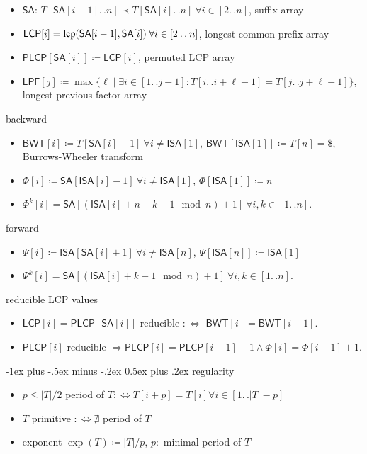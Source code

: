 \documentclass[10pt,landscape]{article}
\makeatletter
\renewcommand{\section}{\@startsection{section}{1}{0mm}%
                                {-1ex plus -.5ex minus -.2ex}%
                                {0.5ex plus .2ex}%
                                {\normalfont\large\itshape}}
\newcommand*{\EndZeichen}{\texttt{\$}}
\newcommand*{\IC}{\mathbin{{.}\,{.}}} %
\newcommand*{\abs}[1]{\ensuremath{|#1|}} %
\newcommand*{\instancename}[1]{\ensuremath{\mathsf{#1}}} %
\newcommand*{\LPF} {\instancename{LPF}}
\newcommand*{\LCPA} {\instancename{LCP}}
\newcommand*{\PLCP}{\instancename{PLCP}}
\newcommand*{\ISA} {\instancename{ISA}}
\newcommand*{\SA}  {\instancename{SA}}
\newcommand*{\BWT}  {\instancename{BWT}}
\newcommand*{\textT}  {\ensuremath{T}}
\newcommand*{\functionname}[1]{{\ensuremath{\renewcommand{\rmdefault}{ptm}\fontfamily{ppl}\selectfont\textrm{\textup{#1}}}}} %
\newcommand*{\lcp}{\functionname{lcp}}
\makeatother
\begin{document}
\begin{multicols}{2}
\begin{itemize}
	\item $\SA$: $\textT[\SA[i-1]\IC{}n] \prec \textT[\SA[i]\IC{}n]~\forall i \in [2\IC{}n]$, suffix array~\cite{manber93sa}
	\item $\LCPA[i] = \lcp(\SA[i-1], \SA[i])~\forall i \in [2\IC{}n]$, longest common prefix array
	\item $\PLCP[ {\SA[i]} ] \coloneqq \LCPA[i]$, permuted LCP array~\cite{kasai01lcp}
	\item $\LPF[j] \coloneqq \max\{\ell \mid \exists i \in [1\IC{}j-1] : \textT[i\IC{}i+\ell-1] = \textT[j\IC{}j+\ell-1]\}$, longest previous factor array~\cite{franek03lpf,crochemore08lpf}
\end{itemize}
backward
\begin{itemize}
	\item $\BWT[i] \coloneqq \textT[\SA[i]-1]~\forall i \not= \ISA[1]$, $\BWT[\ISA[1]] \coloneqq \textT[n] = \EndZeichen$, Burrows-Wheeler transform~\cite{burrows94bwt}
	\item $\Phi[i] \coloneqq \SA[ {\ISA[i]} - 1]~\forall i \not= \ISA[1]$, $\Phi[\ISA[1]] \coloneqq n$~\cite{karkkainen09plcp}
	\item $\Phi^{k}[i] = \SA[ ({\ISA[i]} + n - k-1 \mod n) + 1]~\forall i,k \in [1\IC{}n]$.
\end{itemize}
forward
\begin{itemize}
	\item $\Psi[i] \coloneqq \ISA[ {\SA[i]} + 1 ]~\forall i \not= \ISA[n]$, $\Psi[\ISA[n]] \coloneqq \ISA[1]$
	\item $\Psi^{k}[i] = \SA[ ({\ISA[i]} + k-1 \mod n) + 1]~\forall i,k \in [1\IC{}n]$.
\end{itemize}

reducible LCP values
\begin{itemize}
	\item $\LCPA[i] = \PLCP[\SA[i]]$ reducible $:\Leftrightarrow$ $\BWT[i] = \BWT[i-1]$.
	\item $\PLCP[i]$ reducible $\Rightarrow \PLCP[i] = \PLCP[i-1] - 1 \wedge \Phi[i] = \Phi[i-1]+1$. \cite{karkkainen09plcp}
\end{itemize}



\section{regularity}

\begin{itemize}
	\item    $p \le \abs{T}/2$ period of $T :\Leftrightarrow \textT[i+p] = \textT[i] \forall i\in[1\IC{}\abs{T}-p]$
	\item    $T$ primitive $:\Leftrightarrow \nexists$ period of $T$
	\item    exponent $\exp(T) \coloneqq \abs{T}/p$, $p:$ minimal period of $T$
\end{itemize}


\end{multicols}
\end{document}
